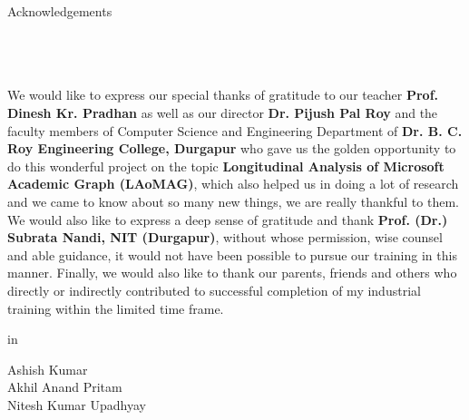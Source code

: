 

\clearpage
\thispagestyle{empty}

\begin{center}
\huge Acknowledgements
\end{center}

\noindent
\\
\\
\\

\indent
We would like to express our special thanks of gratitude to our teacher \textbf{Prof. Dinesh Kr. Pradhan} as well as our director \textbf{Dr. Pijush Pal Roy} and the faculty members of Computer Science and Engineering Department of \textbf{Dr. B. C. Roy Engineering College, Durgapur} who gave us the golden opportunity to do this wonderful project on the topic \textbf{Longitudinal Analysis of Microsoft Academic Graph (LAoMAG)}, which also helped us in doing a lot of research and we came to know about so many new things, we are really thankful to them.\\
\indent
We would also like to express a deep sense of gratitude and thank \textbf{Prof. (Dr.) Subrata Nandi, NIT (Durgapur)}, without whose permission, wise counsel and able guidance, it would not have been possible to pursue our training in this manner. 
Finally, we would also like to thank our parents, friends and others who directly or indirectly contributed to successful completion of my industrial training within the limited time frame.



 in

\begin{flushright}
Ashish Kumar\\
Akhil Anand Pritam\\
Nitesh Kumar Upadhyay
\end{flushright}


%
%
%
%
%



